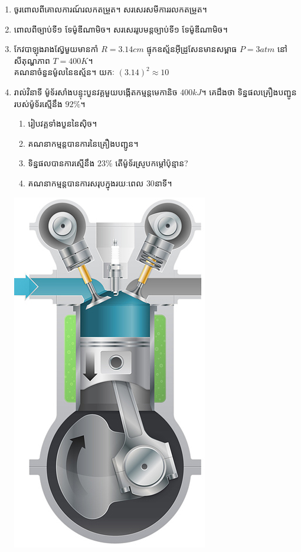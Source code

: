 \documentclass{officialexam}
\begin{document}
\begin{enumerate}[I]
	\item ចូរពោលពីគោលការណ៍រលកតម្រួត។ សរសេរសមីការរលកតម្រួត។
	\item ពោលពីច្បាប់ទី១ ទែម៉ូឌីណាមិច។ សរសេររូបមន្តច្បាប់ទី១ ទែម៉ូឌីណាមិច។
	\item កែវបាឡុងរាងស៊្វែមួយមានកាំ $R=3.14cm$ ផ្ទុកឧស្ម័នអុីដ្រូសែនមានសម្ពាធ $P=3atm$ នៅសីតុណ្ហភាព $T=400K$។ \\ គណនាចំនួនម៉ូលនៃឧស្ម័ន។ យកៈ $\left(3.14\right)^{2}\approx10$
	\item រាល់វិនាទី ម៉ូទ័រសាំងបន្ទុះបួនវគ្គមួយបង្កើតកម្មន្តមេកានិច $400kJ$។ គេដឹងថា ទិន្នផលគ្រឿងបញ្ជូនរបស់ម៉ូទ័រស្មើនឹង $92\%$។
	\begin{multicols}{2}
		\begin{enumerate}[k]
			\item រៀបវគ្គទាំងបួននៃសុិច។
			\item គណនាកម្មន្តបានការនៃគ្រឿងបញ្ជូន។
			\item ទិន្នផលបានការស្មើនឹង $23\%$ តើម៉ូទ័រស្រូបកម្តៅប៉ុន្មាន?
			\item គណនាកម្មន្តបានការសរុបក្នុងរយៈពេល $30$នាទី។
		\end{enumerate}
		\includegraphics[scale=1]{image13}

\end{multicols}
\end{enumerate}
\end{document}
